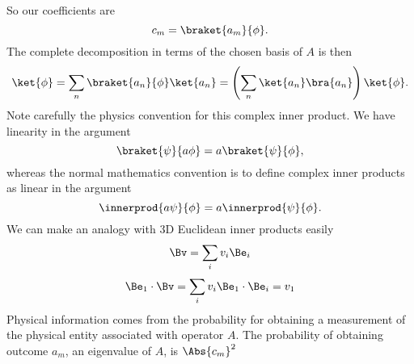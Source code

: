 So our coefficients are
%
\begin{equation}\label{eqn:PHY356FLecture10:51c}
c_m = \braket{a_m}{\phi}.
\end{equation}
%
The complete decomposition in terms of the chosen basis of \(A\) is then
%
\begin{equation}\label{eqn:PHY356FLecture10:51b}
\ket{\phi} = \sum_n \braket{a_n}{\phi} \ket{a_n}
= \left( \sum_n \ket{a_n} \bra{a_n} \right) \ket{\phi}.
\end{equation}
%
Note carefully the physics convention for this complex inner product.  We have linearity in the  argument
\begin{equation}\label{eqn:PHY356FLecture10:51e}
\braket{\psi}{a \phi} = a \braket{\psi}{\phi},
\end{equation}
%
whereas the normal mathematics convention is to define complex inner products as linear in the  argument
%
\begin{equation}\label{eqn:PHY356FLecture10:51f}
\innerprod{a \psi}{\phi} = a \innerprod{\psi}{\phi}.
\end{equation}
%
We can make an analogy with 3D Euclidean inner products easily
%
\begin{equation}\label{eqn:lecture5BigReviewCh1Formalism:91}
\begin{aligned}
\Bv = \sum_i v_i \Be_i
\end{aligned}
\end{equation}
%
\begin{equation}\label{eqn:lecture5BigReviewCh1Formalism:111}
\begin{aligned}
\Be_1 \cdot \Bv = \sum_i v_i \Be_1 \cdot \Be_i = v_1
\end{aligned}
\end{equation}
%
Physical information comes from the probability for obtaining a measurement of the physical entity associated with operator \(A\).  The probability of obtaining outcome \(a_m\), an eigenvalue of \(A\), is \(\Abs{c_m}^2\)


